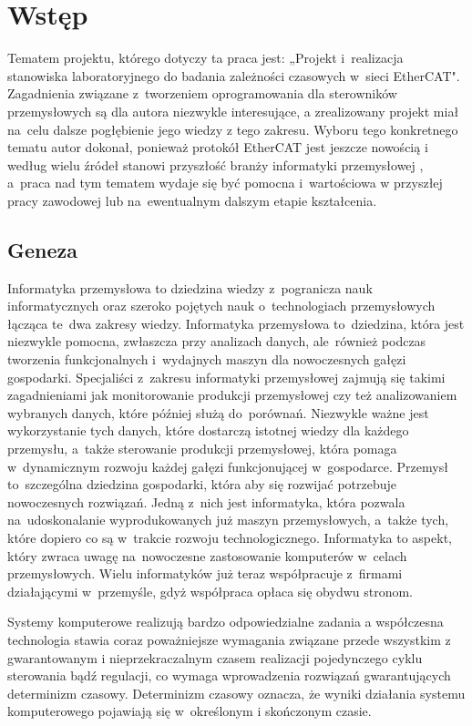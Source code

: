 \section{Wstęp}
Tematem projektu, którego dotyczy ta praca jest: „Projekt i~realizacja stanowiska laboratoryjnego do badania zależności czasowych w~sieci EtherCAT". Zagadnienia związane z~tworzeniem oprogramowania dla sterowników przemysłowych są dla autora niezwykle interesujące, a zrealizowany projekt miał na~celu dalsze pogłębienie jego wiedzy z tego zakresu. Wyboru tego konkretnego tematu autor dokonał, ponieważ protokół EtherCAT jest jeszcze nowością i według wielu źródeł stanowi przyszłość branży informatyki przemysłowej \cite{art1_etherCAT, art2_etherCAT}, a~praca nad tym tematem wydaje się być pomocna i~wartościowa w przyszłej pracy zawodowej lub na~ewentualnym dalszym etapie kształcenia.

\subsection{Geneza}
Informatyka przemysłowa to dziedzina wiedzy z~pogranicza nauk informatycznych oraz szeroko pojętych nauk o~technologiach przemysłowych łącząca te~dwa zakresy wiedzy. Informatyka przemysłowa to~dziedzina, która jest niezwykle pomocna, zwłaszcza przy analizach danych, ale~również podczas tworzenia funkcjonalnych i~wydajnych maszyn dla nowoczesnych gałęzi gospodarki. Specjaliści z~zakresu informatyki przemysłowej zajmują się takimi zagadnieniami jak monitorowanie produkcji przemysłowej czy też analizowaniem wybranych danych, które później służą do~porównań. Niezwykle ważne jest wykorzystanie tych danych, które dostarczą istotnej wiedzy dla każdego przemysłu, a~także sterowanie produkcji przemysłowej, która pomaga w~dynamicznym rozwoju każdej gałęzi funkcjonującej w~gospodarce. 
Przemysł to~szczególna dziedzina gospodarki, która aby się rozwijać potrzebuje nowoczesnych rozwiązań. Jedną z~nich jest informatyka, która pozwala na~udoskonalanie wyprodukowanych już maszyn przemysłowych, a~także tych, które dopiero co są w~trakcie rozwoju technologicznego. Informatyka to aspekt, który zwraca uwagę na~nowoczesne zastosowanie komputerów w~celach przemysłowych. Wielu informatyków już teraz współpracuje z~firmami działającymi w~przemyśle, gdyż współpraca opłaca się obydwu stronom.

Systemy komputerowe realizują bardzo odpowiedzialne zadania a współczesna technologia stawia coraz poważniejsze wymagania związane przede wszystkim z gwarantowanym i nieprzekraczalnym czasem realizacji pojedynczego cyklu sterowania bądź regulacji, co wymaga wprowadzenia rozwiązań gwarantujących determinizm czasowy. Determinizm czasowy oznacza, że wyniki działania systemu komputerowego pojawiają się w~określonym i skończonym czasie.

